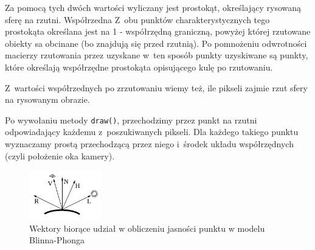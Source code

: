 \documentclass[a4paper]{article}
\begin{document}
{\begin{figure}[h]
  \centering
\end{figure}

Za pomocą tych dwóch wartości wyliczany jest prostokąt, określający rysowaną sferę na rzutni.
Współrzedna Z~obu punktów charakterystycznych tego prostokąta określana jest na 1 - współrzędną graniczną, powyżej której rzutowane obiekty sa obcinane (bo znajdują się przed rzutnią).
Po pomnożeniu odwrotności macierzy rzutowania przez uzyskane w~ten sposób punkty uzyskiwane są punkty, które określają współrzędne prostokąta opisującego kulę po rzutowaniu.

Z~wartości współrzednych po zrzutowaniu wiemy też, ile pikseli zajmie rzut sfery na rysowanym obrazie.

Po wywołaniu metody \texttt{draw()}, przechodzimy przez punkt na rzutni odpowiadający każdemu z~poszukiwanych pikseli.
Dla każdego takiego punktu wyznaczamy prostą przechodzącą przez niego i~środek układu współrzędnych (czyli położenie oka kamery).

\begin{figure}[h]
  \centering
  \includegraphics[width=0.28\textwidth]{blinn.png}
  \caption{Wektory biorące udział w obliczeniu jasności punktu w modelu Blinna-Phonga}
\end{figure}

}
\end{document}

